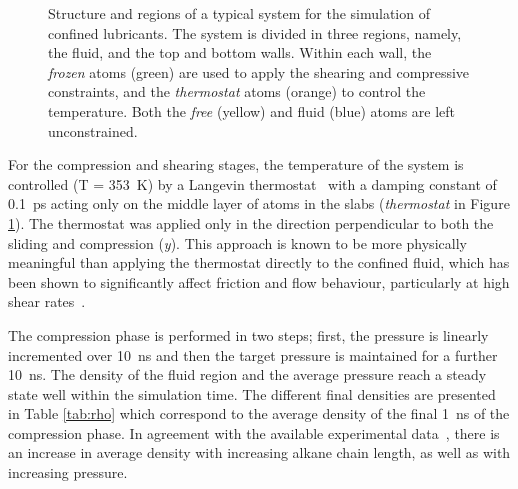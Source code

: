 \documentclass[5p]{elsarticle}
\begin{document}
\begin{figure}[htp]
\begin{center}
		\caption{Structure and regions of a typical system for the simulation of confined lubricants. The system is divided in three regions, namely, the fluid, and the top and bottom walls. Within each wall, the \textit{frozen} atoms (green) are used to apply the shearing and compressive constraints, and  the \textit{thermostat} atoms (orange) to control the temperature. Both the \textit{free} (yellow) and fluid (blue) atoms are left unconstrained.}
		\label{fig:Regions}
	\end{center}
\end{figure}

For the compression and shearing stages, the temperature of the system is controlled (T = \SI{353}{\kelvin}) by a Langevin thermostat~\cite{Schneider1978} with a damping constant of \SI{0.1}{\pico\second} acting only on the middle layer of atoms in the slabs (\textit{thermostat} in Figure \ref{fig:Regions}). The thermostat was applied only in the direction perpendicular to both the sliding and compression (\emph{y}). This approach is known to be more physically meaningful than applying the thermostat directly to the confined fluid, which has been shown to significantly affect friction and flow behaviour, particularly at high shear rates~\cite{Liem1992,Bernardi2010,Yong2013}.

The compression phase is performed in two steps; first, the pressure is linearly incremented over \SI{10}{\nano\second} and then the target pressure is maintained for a further \SI{10}{\nano\second}. The density of the fluid region and the average pressure reach a steady state well within the simulation time. The different final densities are presented in Table \ref{tab:rho} which correspond to the average density of the final \SI{1}{\nano\second} of the compression phase. In agreement with the available experimental data~\cite{Griesbaum2000}, there is an increase in average density with increasing alkane chain length, as well as with increasing pressure.
\end{document}
